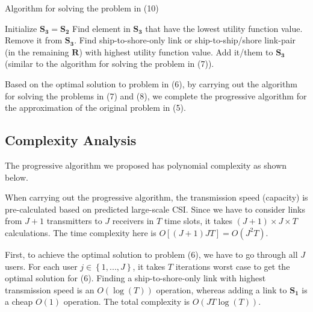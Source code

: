 \documentclass[journal]{IEEEtran}
\begin{document}
   \begin{algorithm}[ht]
   \caption{Algorithm for solving the problem in (10)}
   \begin{algorithmic}[1]
   \STATE Initialize ${{\mathbf{S}}_{\mathbf{3}}}={{\mathbf{S}}_{\mathbf{2}}}$
     \STATE Find element in ${{\mathbf{S}}_{\mathbf{3}}}$ that have the lowest utility function value. 
     \STATE Remove it from ${{\mathbf{S}}_{\mathbf{3}}}$.
      \STATE Find ship-to-shore-only link or ship-to-ship/shore link-pair (in the remaining ${\mathbf{R}}$) with highest utility function value. 
      \STATE Add it/them to ${{\mathbf{S}}_{\mathbf{3}}}$ (similar to the algorithm for solving the problem in (7)). 
     \ENDWHILE
    \ENDIF
   \ENDFOR
   \end{algorithmic}
   \end{algorithm}

   Based on the optimal solution to problem in (6), by carrying out the algorithm for solving the problems in (7) and (8), we complete the progressive algorithm for the approximation of the original problem in (5).
  
  
   \subsection{Complexity Analysis}
  
   The progressive algorithm we proposed has polynomial complexity as shown below. 
   
   When carrying out the progressive algorithm, the transmission speed (capacity) is pre-calculated based on predicted large-scale CSI. Since we have to consider links from $J+1$ transmitters to $J$ receivers in $T$ time slots, it takes $\left( {J + 1} \right) \times J \times T$ calculations. The time complexity here is $O\left[ {\left( {J + 1} \right)JT} \right] = O\left( {{J^2}T} \right)$. 
  
   First, to achieve the optimal solution to problem (6), we have to go through all $J$ users. For each user $j \in \left\{ {1,...,J} \right\}$, it takes $T$ iterations worst case to get the optimal solution for (6). Finding a ship-to-shore-only link with highest transmission speed is an $O\left( \log \left( T \right) \right)$ operation, whereas adding a link to ${{\mathbf{S}}_{\mathbf{1}}}$ is a cheap $O\left( 1 \right)$ operation. The total complexity is $O\left( J T\log \left( T \right) \right)$.
  
\end{document}
